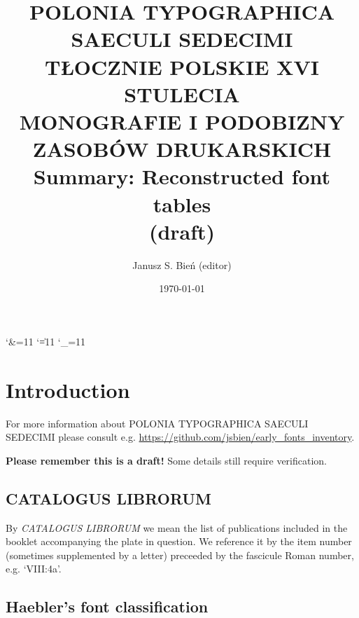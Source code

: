 \documentclass[12pt]{article}
\begin{document}


\title{POLONIA TYPOGRAPHICA
  SAECULI SEDECIMI\\
  { TŁOCZNIE POLSKIE XVI STULECIA\\ MONOGRAFIE I PODOBIZNY
    ZASOBÓW DRUKARSKICH}\\Summary: Reconstructed font tables\\
  (draft)}

\author{Janusz S. Bień (editor)}

\date{\today}

\maketitle

\catcode`\&=11
\catcode`\|=11
\catcode`\_=11

\def\apostrof{`}



\def\Hb#1{{\fontspec{Junicode}#1}}

\section{Introduction}
\label{sec:introduction}

For more information about \textsc{POLONIA TYPOGRAPHICA SAECULI
  SEDECIMI} please consult
e.g. \url{https://github.com/jsbien/early_fonts_inventory}.

\bigskip

\bigskip \textbf{Please remember this is a draft!} Some details still
require verification.

\subsection{CATALOGUS LIBRORUM}
\label{sec:catalogus-librorum}

By \textit{CATALOGUS LIBRORUM} we mean the list of publications
included in the booklet accompanying the plate in question. We
reference it by the item number (sometimes supplemented by a letter)
preceeded by the fascicule Roman number, e.g. `VIII:4a'.


\subsection{Haebler's font classification}
\label{sec:haebl-font-class}
\end{document}
